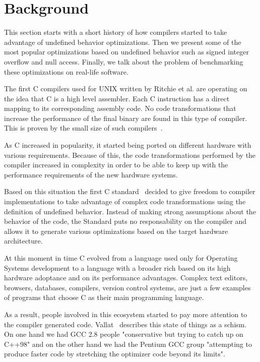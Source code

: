 \section{Background} \label{sec:bg}

This section starts with a short history of how compilers started to
take advantage of undefined behavior optimizations. Then we present some
of the most popular optimizations based on undefined behavior such as
signed integer overflow and null access. Finally, we talk about the
problem of benchmarking these optimizations on real-life software.

The first C compilers used for UNIX written by Ritchie et al. are
operating on the idea that C is a high level assembler. Each C
instruction has a direct mapping to its corresponding assembly code. No
code transformations that increase the performance of the final binary
are found in this type of compiler. This is proven by the small size of
such compilers~\cite{ritchiecomp}. 

As C increased in popularity, it started being ported on different
hardware with various requirements. Because of this, the code
transformations performed by the compiler increased in complexity in
order to be able to keep up with the performance requirements of the new
hardware systems.

Based on this situation the first C standard~\cite{iso90} decided to
give freedom to compiler implementations to take advantage of complex
code transformations using the definition of undefined behavior. Instead
of making strong assumptions about the behavior of the code, the
Standard puts no responsability on the compiler and allows it to
generate various optimizations based on the target hardware
architecture.

At this moment in time C evolved from a language used only for Operating
Systems development to a language with a broader rich based on its high
hardware adoptance and on its performance advantages. Complex text
editors, browsers, databases, compilers, version control systems,
are just a few examples of programs that choose C as their main
programming language.

As a result, people involved in this ecosystem started to pay more
attention to the compiler generated code. Vallat~\cite{vallat} describes
this state of things as a schism. On one hand we had GCC 2.8 people
"conservative but trying to catch up on C++98" and on the other hand we
had the Pentium GCC group "attempting
to produce faster code by stretching the optimizer code beyond its
limits".

